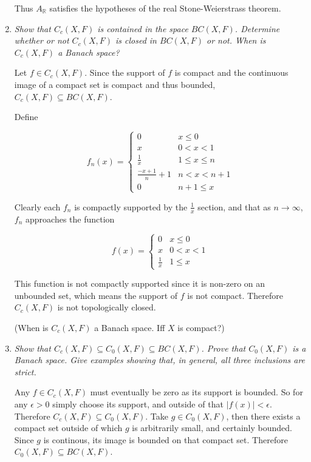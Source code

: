 \documentclass[11pt]{article}
\begin{document}
\begin{enumerate}
Thus $A_\mathbb{R}$ satisfies the hypotheses of the real Stone-Weierstrass theorem.

\item \emph{Show that $C_c(X,F)$ is contained in the space $BC(X,F)$.  Determine whether or not $C_c(X,F)$ is closed in $BC(X,F)$ or not.  When is $C_c(X,F)$ a Banach space?}

Let $f \in C_c(X,F)$.  Since the support of $f$ is compact and the continuous image of a compact set is compact and thus bounded, $C_c(X,F) \subseteq BC(X,F)$.

Define 

\begin{equation*}
f_n(x) = 
\begin{cases}
0 & x \leq 0 \\
x & 0 < x < 1 \\
\frac{1}{x} & 1 \leq x \leq n \\
\frac{-x+1}{n} + 1 & n < x < n+1 \\
0 & n+1 \leq x
\end{cases}
\end{equation*}

Clearly each $f_n$ is compactly supported by the $\frac{1}{x}$ section, and that as $n \rightarrow \infty$, $f_n$ approaches the function

\begin{equation*}
f(x) = 
\begin{cases}
0 & x \leq 0 \\
x & 0 < x < 1 \\
\frac{1}{x} & 1 \leq x
\end{cases}
\end{equation*}

This function is not compactly supported since it is non-zero on an unbounded set, which means the support of $f$ is not compact.  Therefore $C_c(X,F)$ is not topologically closed.

(When is $C_c(X,F)$ a Banach space.  Iff $X$ is compact?)

\item \emph{Show that $C_c(X,F) \subseteq C_0(X,F) \subseteq BC(X,F)$.  Prove that $C_0(X,F)$ is a Banach space.  Give examples showing that, in general, all three inclusions are strict.}

Any $f \in C_c(X,F)$ must eventually be zero as its support is bounded.  So for any $\epsilon > 0$ simply choose its support, and outside of that $|f(x)| < \epsilon$.  Therefore $C_c(X,F) \subseteq C_0(X,F)$.  Take $g \in C_0(X,F)$, then there exists a compact set outside of which $g$ is arbitrarily small, and certainly bounded.  Since $g$ is continous, its image is bounded on that compact set.  Therefore $C_0(X,F) \subseteq BC(X,F)$.


\end{enumerate}
\end{document}
